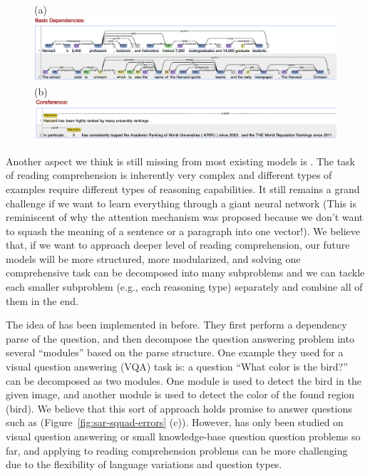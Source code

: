 \begin{figure}[t]
  \center
  (a)
  \includegraphics[scale=0.20]{img/dep_example.png}
  (b)
  \includegraphics[scale=0.42]{img/coref_example.png}
\end{figure}

Another aspect we think is still missing from most existing models is . The task of reading comprehension is inherently very complex and different types of examples require different types of reasoning capabilities. It still remains a grand challenge if we want to learn everything through a giant neural network (This is reminiscent of why the attention mechanism was proposed because we don't want to squash the meaning of a sentence or a paragraph into one vector!). We believe that, if we want to approach deeper level of reading comprehension, our future models will be more structured, more modularized, and solving one comprehensive task can be decomposed into many subproblems and we can tackle each smaller subproblem (e.g., each reasoning type) separately and combine all of them in the end.

The idea of  has been implemented in  \cite{andreas2016learning} before. They first perform a dependency parse of the question, and then decompose the question answering problem into several ``modules'' based on the parse structure. One example they used for a visual question answering (VQA) task is: a question ``What color is the bird?'' can be decomposed as two modules. One module is used to detect the bird in the given image, and another module is used to detect the color of the found region (bird). We believe that this sort of approach holds promise to answer questions such as  (Figure~\ref{fig:sar-squad-errors} (c)). However,  has only been studied on visual question answering or small knowledge-base question question problems so far, and applying to reading comprehension problems can be more challenging due to the flexibility of language variations and question types.

